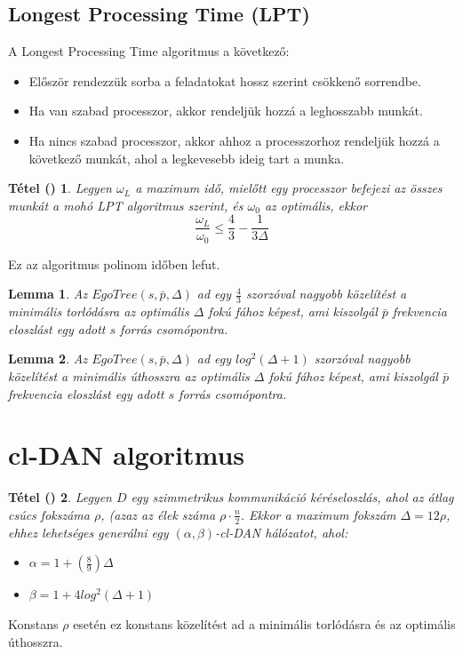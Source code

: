 \documentclass[12pt]{report}
\newtheorem{mytetel}{Tétel (\cite{avin_demand-aware_nodate})}
\newtheorem{mylemma}{Lemma}
\begin{document}
\subsection{Longest Processing Time (LPT)}

A Longest Processing Time \cite{Graham1969BoundsOM} algoritmus a következő:

\begin{itemize}
	\item Először rendezzük sorba a feladatokat hossz szerint csökkenő sorrendbe.
	\item Ha van szabad processzor, akkor rendeljük hozzá a leghosszabb munkát.
	\item Ha nincs szabad processzor, akkor ahhoz a processzorhoz rendeljük hozzá a következő munkát, ahol a legkevesebb ideig tart a munka.
\end{itemize}

\begin{mytetel}
	Legyen \(\omega_L\) a maximum idő, mielőtt egy processzor befejezi az összes munkát a mohó LPT algoritmus szerint, és \(\omega_0\) az optimális, ekkor \[\frac{\omega_L}{\omega_0} \le \frac{4}{3} - \frac{1}{3\Delta}\]
\end{mytetel}

Ez az algoritmus polinom időben lefut.

\begin{mylemma}
	Az \(EgoTree(s, \bar{p}, \Delta)\) ad egy \(\frac{4}{3}\) szorzóval nagyobb közelítést a minimális torlódásra az optimális \(\Delta\) fokú fához képest, ami kiszolgál \(\bar{p}\) frekvencia eloszlást egy adott \(s\) forrás csomópontra.
\end{mylemma}

\begin{mylemma}
	Az \(EgoTree(s, \bar{p}, \Delta)\) ad egy \(log^2(\Delta + 1)\) szorzóval nagyobb közelítést a minimális úthosszra az optimális \(\Delta\) fokú fához képest, ami kiszolgál \(\bar{p}\) frekvencia eloszlást egy adott \(s\) forrás csomópontra.
\end{mylemma}

\section{cl-DAN algoritmus}

\begin{mytetel}
	Legyen \(D\) egy szimmetrikus kommunikáció kéréseloszlás, ahol az átlag csúcs fokszáma \(\rho\), (azaz az élek száma \(\rho \cdot \frac{n}{2}\). Ekkor a maximum fokszám \(\Delta = 12\rho\), ehhez lehetséges generálni egy \((\alpha, \beta)\)-cl-DAN hálózatot, ahol:
	\begin{itemize}
		\item \(\alpha = 1 + (\frac{8}{9})\Delta\)
		\item \(\beta = 1 + 4log^2(\Delta + 1)\)
	\end{itemize}
\end{mytetel}
Konstans \(\rho\) esetén ez konstans közelítést ad a minimális torlódásra és az optimális úthosszra.
\end{document}
